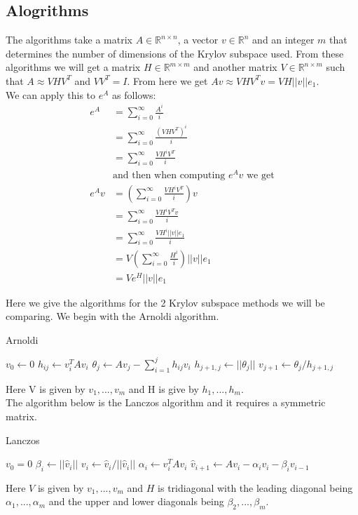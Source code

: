 \documentclass{article}
\begin{document}
\subsection{Alogrithms}
The algorithms take a matrix $A\in \mathbb{R}^{n\times n}$, a vector $v \in \mathbb{R}^n$ and an integer $m$ that determines the number of dimensions of the Krylov subspace used.
From these algorithms we will get a matrix $H \in \mathbb{R}^{m\times m}$ and another matrix $V \in \mathbb{R}^{n\times m}$ such that $A \approx VHV^T$ and $VV^T = I$.
From here we get $Av \approx VHV^Tv = VH||v||e_1$.\\
We can apply this to $e^A$ as follows:
\begin{align*}
e^A &= \sum^{\infty}_{i=0}\frac{A^i}{i\!}\\
&= \sum^{\infty}_{i=0}\frac{(VHV^T)^i}{i\!} \\
&= \sum^{\infty}_{i=0}\frac{VH^iV^T}{i\!} \\
&\text {and then when computing $e^Av$ we get}\\
e^Av &= (\sum^{\infty}_{i=0}\frac{VH^iV^T}{i\!})v \\
&= \sum^{\infty}_{i=0}\frac{VH^iV^Tv}{i\!} \\
&= \sum^{\infty}_{i=0}\frac{VH^i||v||e_1}{i\!} \\
&= V(\sum^{\infty}_{i=0}\frac{H^i}{i\!})||v||e_1 \\
&= Ve^H||v||e_1
\end{align*}

Here we give the algorithms for the 2 Krylov subspace methods we will be comparing.
We begin with the Arnoldi algorithm.


\begin{algorithm}[H]
\caption{Arnoldi \cite{Fan2018}} %
\begin{algorithmic}
\State $v_0 \gets 0$
\State$h_{ij} \gets v_i^T A v_i$
\EndFor
\State$\theta_j \gets Av_j - \sum^j_{i=1} h_{ij}v_i$
\State$h_{j+1,j} \gets ||\theta_j||$
\State$v_{j+1} \gets \theta_j/h_{j+1,j}$
\EndFor
\EndProcedure
\end{algorithmic}
\end{algorithm}
Here V is given by $v_1,...,v_m$ and H is give by $h_1,...,h_m$.\\
The algorithm below is the Lanczos algorithm and it requires a symmetric matrix. \cite{Moler2003}
\begin{algorithm}[H]
\caption{Lanczos \cite{OJALVO1970}}
\begin{algorithmic}
\State $v_0 = 0$
\State$\beta_i \gets || \hat v_i ||$
\State$v_i \gets \hat v_i / || \hat v_i ||$
\State$\alpha_i \gets v_i^T A v_i$
\State$\hat v_{i+1} \gets Av_i - \alpha_iv_i - \beta_iv_{i-1}$
\EndFor
\EndProcedure
\end{algorithmic}
\end{algorithm}
Here $V$ is given by ${v_1,...,v_m}$ and $H$ is tridiagonal with the leading diagonal being $\alpha_1, ..., \alpha_m$ and the upper and lower diagonals being $\beta_2,...,\beta_m$.
\end{document}
